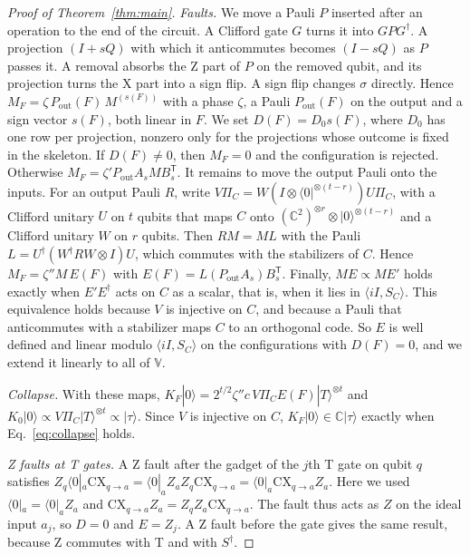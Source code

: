 \documentclass[aps,prl,reprint,twocolumn,amsmath,amssymb,floatfix,nofootinbib,superscriptaddress]{revtex4-2}
\theoremstyle{definition}
\theoremstyle{remark}
\newcommand{\fs}{\mathbb V}
\begin{document}
\begin{proof}[Proof of Theorem~\ref{thm:main}]
\emph{Faults.} We move a Pauli $P$ inserted after an operation to the end of the circuit. A Clifford gate $G$ turns it into $GPG^\dagger$. A projection $(I+sQ)$ with which it anticommutes becomes $(I-sQ)$ as $P$ passes it. A removal absorbs the Z part of $P$ on the removed qubit, and its projection turns the X part into a sign flip. A sign flip changes $\sigma$ directly. Hence $M_F=\zeta\,P_{\mathrm{out}}(F)\,M^{(s(F))}$ with a phase $\zeta$, a Pauli $P_{\mathrm{out}}(F)$ on the output and a sign vector $s(F)$, both linear in $F$. We set $D(F)=D_0s(F)$, where $D_0$ has one row per projection, nonzero only for the projections whose outcome is fixed in the skeleton. If $D(F)\neq0$, then $M_F=0$ and the configuration is rejected. Otherwise $M_F=\zeta'P_{\mathrm{out}}A_{s}MB_{s}^{\mathsf T}$. It remains to move the output Pauli onto the inputs. For an output Pauli $R$, write $V\Pi_C=W(I\otimes\langle0|^{\otimes(t-r)})U\Pi_C$, with a Clifford unitary $U$ on $t$ qubits that maps $C$ onto $(\mathbb C^2)^{\otimes r}\otimes|0\rangle^{\otimes(t-r)}$ and a Clifford unitary $W$ on $r$ qubits. Then $RM=ML$ with the Pauli $L=U^\dagger(W^\dagger RW\otimes I)U$, which commutes with the stabilizers of $C$. Hence $M_F=\zeta''M\,E(F)$ with $E(F)=L(P_{\mathrm{out}}A_s)B_s^{\mathsf T}$. Finally, $ME\propto ME'$ holds exactly when $E'E^\dagger$ acts on $C$ as a scalar, that is, when it lies in $\langle iI,S_C\rangle$. This equivalence holds because $V$ is injective on $C$, and because a Pauli that anticommutes with a stabilizer maps $C$ to an orthogonal code. So $E$ is well defined and linear modulo $\langle iI,S_C\rangle$ on the configurations with $D(F)=0$, and we extend it linearly to all of $\fs$.

\emph{Collapse.} With these maps, $K_F|0\rangle=2^{t/2}\zeta''c\,V\Pi_CE(F)|T\rangle^{\otimes t}$ and $K_0|0\rangle\propto V\Pi_C|T\rangle^{\otimes t}\propto|\tau\rangle$. Since $V$ is injective on $C$, $K_F|0\rangle\in\mathbb C|\tau\rangle$ exactly when Eq.~\eqref{eq:collapse} holds.

\emph{Z faults at T gates.} A Z fault after the gadget of the $j$th T gate on qubit $q$ satisfies $Z_q\langle0|_a\mathrm{CX}_{q\to a}=\langle0|_aZ_aZ_q\mathrm{CX}_{q\to a}=\langle0|_a\mathrm{CX}_{q\to a}Z_a$. Here we used $\langle0|_a=\langle0|_aZ_a$ and $\mathrm{CX}_{q\to a}Z_a=Z_qZ_a\mathrm{CX}_{q\to a}$. The fault thus acts as $Z$ on the ideal input $a_j$, so $D=0$ and $E=Z_j$. A Z fault before the gate gives the same result, because Z commutes with T and with $S^\dagger$.
\end{proof}
\end{document}
